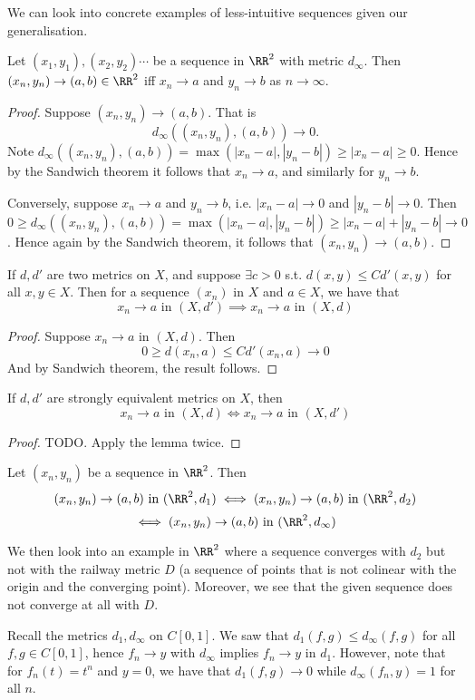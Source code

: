 We can look into concrete examples of less-intuitive sequences given our
generalisation.
\begin{proposition}
  Let $(x_1,y_1),(x_2,y_2)\cdots$ be a sequence in $\RR^2$ with metric
  $d_{\infty}$. Then  $(x_n,y_n)\to(a,b)\in\RR^2$ iff $x_n\to a$ and $y_n\to b$
  as $n\to\infty$.
  \label{prop:convergenceR2}
\end{proposition}
\begin{proof}
  Suppose $(x_n,y_n)\to(a,b)$. That is 
  \[d_{\infty}\left( (x_n,y_n),(a,b) \right)\to 0.\]
  Note $d_{\infty}\left( (x_n,y_n),(a,b) \right) = \max (|x_n-a|,|y_n-b|)\geq
  |x_n-a|\geq 0$. Hence by the Sandwich theorem it follows that $x_n\to a$,
  and similarly for $y_n\to b$. 

  Conversely, suppose $x_n\to a$ and $y_n\to b$, i.e. $|x_n-a|\to 0$ and
  $|y_n-b|\to 0$. Then $0\geq d_{\infty} \left( (x_n,y_n),(a,b)
  \right)=\max(|x_n-a|,|y_n-b|) \geq |x_n-a|+|y_n-b|\to 0$. Hence again by the
  Sandwich theorem, it follows that $(x_n,y_n)\to(a,b)$.
\end{proof}
\begin{lemma}
  If $d,d'$ are two metrics on $X$, and suppose $\exists c>0$ s.t. $d(x,y)\leq
  Cd'(x,y)$ for all $x,y\in X$. Then for a sequence $(x_n)$ in $X$ and $a\in X$,
  we have that 
  \[x_n\to a \text{ in $(X,d')$}\implies x_n\to a \text{ in $(X,d)$}\]
  \label{<+label+>}
\end{lemma}
\begin{proof}
  Suppose $x_n\to a$ in $(X,d)$. Then 
  \[0\geq d(x_n,a)\leq Cd'(x_n,a)\to 0\]
  And by Sandwich theorem, the result follows. 
\end{proof}

\begin{corollary}
  If $d,d'$ are strongly equivalent metrics on $X$, then 
  \[x_n\to a \text{ in $(X,d)$}\iff x_n\to a \text{ in $(X,d')$}\]
  \label{<+label+>}
\end{corollary}
\begin{proof}
  TODO. Apply the lemma twice.
\end{proof}

\begin{corollary}
  Let $(x_n,y_n)$ be a sequence in $\RR^2$. Then 
  \[(x_n,y_n)\to (a,b) \text{ in $(\RR^2,d_1)$} \iff (x_n,y_n)\to (a,b) \text{ in $(\RR^2,d_2)$}\]
  \[\iff (x_n,y_n)\to (a,b) \text{ in $(\RR^2,d_{\infty})$}\]
  \label{<+label+>}
\end{corollary}
We then look into an example in $\RR^2$ where a sequence converges with $d_2$
but not with the railway metric $D$ (a sequence of points that is not colinear
with the origin and the converging point). Moreover, we see that the given
sequence does not converge at all with $D$.

\begin{example}
  Recall the metrics $d_1, d_{\infty}$ on $C[0,1]$. We saw that $d_1(f,g)\leq
  d_{\infty}(f,g)$ for all $f,g\in C[0,1]$, hence $f_n\to y$ with $d_{\infty}$
  implies $f_n\to y$ in $d_1$. However, note that for $f_n(t)=t^n$ and $y=0$, we
  have that $d_1(f,g)\to 0$ while $d_{\infty}(f_n,y)=1$ for all $n$.
\end{example}
